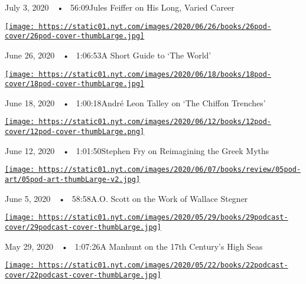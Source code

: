 July 3, 2020~~•~ 56:09Jules Feiffer on His Long, Varied Career

\href{https://www.nytimes.com/2020/06/26/books/review/podcast-richard-haass-world-brief-introduction.html?action=click\&module=audio-series-bar\&region=header\&pgtype=Article}{\texttt{[image: https://static01.nyt.com/images/2020/06/26/books/26pod-cover/26pod-cover-thumbLarge.jpg]}}

June 26, 2020~~•~ 1:06:53A Short Guide to `The World'

\href{https://www.nytimes.com/2020/06/18/books/review/andre-leon-talley-chiffon-trenches-claudia-rankine-jericho-brown-megha-majumdar-burning.html?action=click\&module=audio-series-bar\&region=header\&pgtype=Article}{\texttt{[image: https://static01.nyt.com/images/2020/06/18/books/18pod-cover/18pod-cover-thumbLarge.jpg]}}

June 18, 2020~~•~ 1:00:18André Leon Talley on `The Chiffon Trenches'

\href{https://www.nytimes.com/2020/06/12/books/review/podcast-stephen-fry-heroes-greek-myths.html?action=click\&module=audio-series-bar\&region=header\&pgtype=Article}{\texttt{[image: https://static01.nyt.com/images/2020/06/12/books/12pod-cover/12pod-cover-thumbLarge.png]}}

June 12, 2020~~•~ 1:01:50Stephen Fry on Reimagining the Greek Myths

\href{https://www.nytimes.com/2020/06/05/books/review/podcast-a-o-scott-wallace-stegner-sunny-days-david-kamp.html?action=click\&module=audio-series-bar\&region=header\&pgtype=Article}{\texttt{[image: https://static01.nyt.com/images/2020/06/07/books/review/05pod-art/05pod-art-thumbLarge-v2.jpg]}}

June 5, 2020~~•~ 58:58A.O. Scott on the Work of Wallace Stegner

\href{https://www.nytimes.com/2020/05/29/books/review/podcast-enemy-of-all-mankind-piracy-steven-johnson-stephen-king-gilbert-cruz.html?action=click\&module=audio-series-bar\&region=header\&pgtype=Article}{\texttt{[image: https://static01.nyt.com/images/2020/05/29/books/29podcast-cover/29podcast-cover-thumbLarge.jpg]}}

May 29, 2020~~•~ 1:07:26A Manhunt on the 17th Century's High Seas

\href{https://www.nytimes.com/2020/05/22/books/review/podcast-one-mighty-irresistible-tide-immigration-jia-lynn-yang-simplify-life-judith-newman.html?action=click\&module=audio-series-bar\&region=header\&pgtype=Article}{\texttt{[image: https://static01.nyt.com/images/2020/05/22/books/22podcast-cover/22podcast-cover-thumbLarge.jpg]}}

